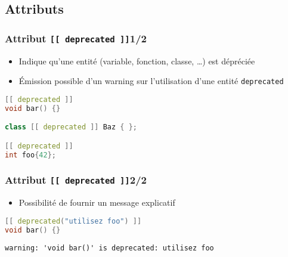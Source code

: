 \documentclass[C++.tex]{subfiles}
\begin{document}
\subsection*{Attributs}
\begin{frame}[fragile]
	\frametitle{Attribut \lstinline|[[ deprecated ]]|\titlehfill{}1/2}
	\begin{itemize}
		\item Indique qu'une entité (variable, fonction, classe, \ldots) est dépréciée
		\item Émission possible d'un warning sur l'utilisation d'une entité \lstinline|deprecated|

	\end{itemize}

	\begin{lstlisting}[language=C++]
[[ deprecated ]]
void bar() {}

class [[ deprecated ]] Baz { };

[[ deprecated ]]
int foo{42};\end{lstlisting}
\end{frame}

\begin{frame}[fragile]
	\frametitle{Attribut \lstinline|[[ deprecated ]]|\titlehfill{}2/2}
	\begin{itemize}
		\item Possibilité de fournir un message explicatif
	\end{itemize}

	\begin{lstlisting}[language=C++]
[[ deprecated("utilisez foo") ]]
void bar() {}\end{lstlisting}

	\begin{lstlisting}
warning: 'void bar()' is deprecated: utilisez foo\end{lstlisting}
\end{frame}
\end{document}
